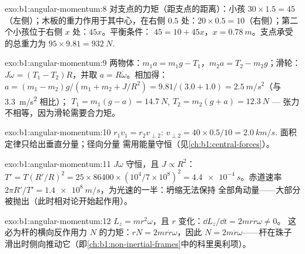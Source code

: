 \begin{solution}{exo:b1:angular-momentum:8}
对支点的力矩（距支点的距离）：小孩 $30 \times 1.5 =
45$（左侧）；木板的重力作用于其中心，在右侧 $0.5$ 处：$20 \times
0.5 = 10$（右侧）；第二个小孩位于右侧 $x$ 处：$45x$。平衡条件：
$45 = 10 + 45x$，$x = \qty{0.78}{m}$。支点承受的总重力为
$95 \times 9.81 = \qty{932}{N}$.
\end{solution}

\begin{solution}{exo:b1:angular-momentum:9}
两物体：$m_1a = m_1g - T_1$，$m_2a = T_2 - m_2g$；滑轮：$J\dot\omega =
(T_1 - T_2)R$，并取 $a = R\dot\omega$。相加得：$a = (m_1 - m_2)g/(m_1 + m_2 +
J/R^2) = 9.81/(3.0 + 1.0) = \qty{2.5}{m/s^2}$（与 \qty{3.3}{m/s^2} 相比）；
$T_1 = m_1(g - a) = \qty{14.7}{N}$, $T_2 = m_2(g + a) = \qty{12.3}{N}$ ---
张力不相等，因为滑轮需要合力矩。
\end{solution}

\begin{solution}{exo:b1:angular-momentum:10}
$r_1v_1 = r_2v_{\perp 2}$: $v_{\perp 2} = 40 \times 0.5/10 = \qty{2.0}{km/s}$.
面积定律只给出垂直分量；径向分量
需用能量守恒（见\cref{ch:b1:central-forces}）。
\end{solution}

\begin{solution}{exo:b1:angular-momentum:11}
$J\omega$ 守恒，且 $J \propto R^2$：$T' = T(R'/R)^2 = 25 \times 86400
\times (10^4/7\times10^8)^2 = \qty{4.4e-4}{s}$。赤道速率 $2\pi R'/T'
= \qty{1.4e8}{m/s}$，为光速的一半：坍缩无法保持
全部角动量——大部分被抛出（此时相对论开始起作用）。
\end{solution}

\begin{solution}{exo:b1:angular-momentum:12}
$L_z = mr^2\omega$，且 $r$ 变化：$\dd L_z/\dd t = 2mr\dot r\omega \neq 0$。
这必为杆的横向反作用力 $N$ 的力矩：$rN =
2mr\dot r\omega$，因此 $N = 2m\dot r\omega$——杆在珠子
滑出时侧向推动它（即\cref{ch:b1:non-inertial-frames}中的科里奥利项）。
\end{solution}

